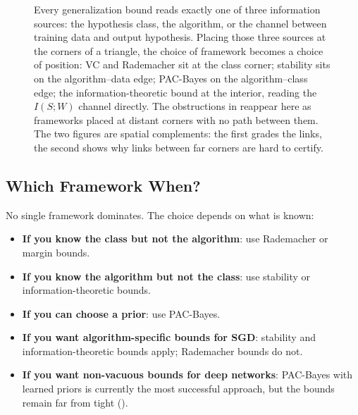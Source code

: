 \begin{figure}[ht]
\caption[Generalization is read from three sources: data, class, or algorithm.]{Every generalization bound reads exactly one of three information sources: the hypothesis class, the algorithm, or the channel between training data and output hypothesis. Placing those three sources at the corners of a triangle, the choice of framework becomes a choice of position: VC and Rademacher sit at the class corner; stability sits on the algorithm--data edge; PAC-Bayes on the algorithm--class edge; the information-theoretic bound at the interior, reading the $I(S;W)$ channel directly. The obstructions in  reappear here as frameworks placed at distant corners with no path between them. The two figures are spatial complements: the first grades the links, the second shows why links between far corners are hard to certify.}
\label{fig:triangle}
\end{figure}


\subsection{Which Framework When?}

No single framework dominates.  The choice depends on what is known:

\begin{itemize}[leftmargin=*, itemsep=3pt]
\item \textbf{If you know the class but not the algorithm}: use
  Rademacher or margin bounds.
\item \textbf{If you know the algorithm but not the class}: use
  stability or information-theoretic bounds.
\item \textbf{If you can choose a prior}: use PAC-Bayes.
\item \textbf{If you want algorithm-specific bounds for SGD}: stability
  and information-theoretic bounds apply; Rademacher bounds do not.
\item \textbf{If you want non-vacuous bounds for deep networks}:
  PAC-Bayes with learned priors is currently the most successful
  approach, but the bounds remain far from tight
  ().
\end{itemize}


